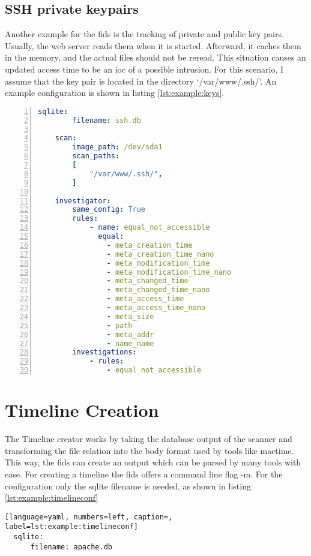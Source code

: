 \subsection{SSH private keypairs}

Another example for the \gls{fids} is the tracking of private and public key pairs. Usually, the web server reads them when it is started. Afterward, it caches them in the memory, and the actual files should not be reread. This situation causes an updated access time to be an \gls{ioc} of a possible intrusion. For this scenario, I assume that the key pair is located in the directory `/var/www/.ssh/'. An example configuration is shown in listing \ref{lst:example:keys}.

\begin{lstlisting}[language=yaml, numbers=left, caption=Example SSH Keypair Configuration, label=lst:example:keys]
    sqlite:
        filename: ssh.db
        
    scan:
        image_path: /dev/sda1
        scan_paths: 
        [
            "/var/www/.ssh/",
        ]

    investigator:
        same_config: True
        rules: 
            - name: equal_not_accessible
              equal:
                - meta_creation_time
                - meta_creation_time_nano
                - meta_modification_time
                - meta_modification_time_nano
                - meta_changed_time
                - meta_changed_time_nano
                - meta_access_time
                - meta_access_time_nano
                - meta_size
                - path
                - meta_addr
                - name_name
        investigations:
            - rules:
                - equal_not_accessible

\end{lstlisting}

\section{Timeline Creation}

The Timeline creator works by taking the database output of the scanner and transforming the file relation into the body format used by tools like mactime. This way, the \gls{fids} can create an output which can be parsed by many tools with ease. For creating a timeline the \gls{fids} offers a command line flag -m. For the configuration only the sqlite filename is needed, as shown in listing \ref{lst:example:timelineconf}

\begin{lstlisting}[language=yaml, numbers=left, caption=, label=lst:example:timelineconf]
  sqlite:
      filename: apache.db

\end{lstlisting}